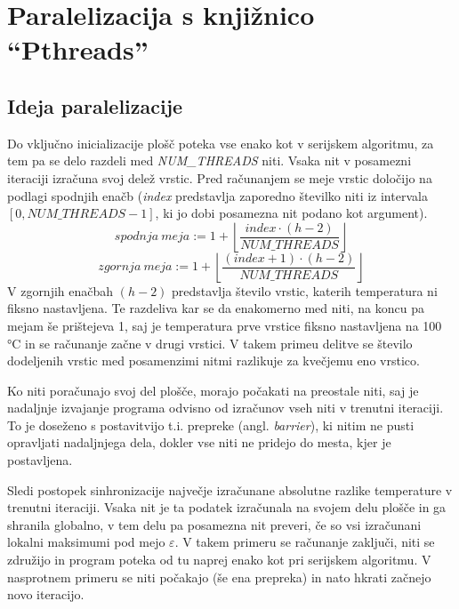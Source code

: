 \documentclass[a4paper,titlepage,11pt]{article}
\begin{document}
\pagebreak

\section{Paralelizacija s knjižnico ``Pthreads''}

\subsection{Ideja paralelizacije} \label{ideja-paralelizacije-pthreads}

Do vključno inicializacije plošč poteka vse enako kot v serijskem algoritmu, za tem pa se delo razdeli med \textit{NUM\_THREADS} niti. Vsaka nit v posamezni iteraciji izračuna svoj delež vrstic. Pred računanjem se meje vrstic določijo na podlagi spodnjih enačb (\textit{index} predstavlja zaporedno številko niti iz intervala $\left[0, NUM\_THREADS - 1\right]$, ki jo dobi posamezna nit podano kot argument).
\begin{equation}
spodnja \ meja := 1 + \left \lfloor{\frac{index \cdot (h - 2)}{NUM\_THREADS}}\right \rfloor
\end{equation}
\begin{equation}
zgornja \ meja := 1 + \left \lfloor{\frac{(index+1) \cdot (h - 2)}{NUM\_THREADS}}\right \rfloor
\end{equation}
V zgornjih enačbah $(h - 2)$ predstavlja število vrstic, katerih temperatura ni fiksno nastavljena. Te razdeliva kar se da enakomerno med niti, na koncu pa mejam še prištejeva 1, saj je temperatura prve vrstice fiksno nastavljena na 100 °C in se računanje začne v drugi vrstici. V takem primeu delitve se število dodeljenih vrstic med posamenzimi nitmi razlikuje za kvečjemu eno vrstico.

Ko niti poračunajo svoj del plošče, morajo počakati na preostale niti, saj je nadaljnje izvajanje programa odvisno od izračunov vseh niti v trenutni iteraciji. To je doseženo s postavitvijo t.i. prepreke (angl. \textit{barrier}), ki nitim ne pusti opravljati nadaljnjega dela, dokler vse niti ne pridejo do mesta, kjer je postavljena.

Sledi postopek sinhronizacije največje izračunane absolutne razlike temperature v trenutni iteraciji. Vsaka nit je ta podatek izračunala na svojem delu plošče in ga shranila globalno, v tem delu pa posamezna nit preveri, če so vsi izračunani lokalni maksimumi pod mejo \(\varepsilon\). V takem primeru se računanje zaključi, niti se združijo in program poteka od tu naprej enako kot pri serijskem algoritmu. V nasprotnem primeru se niti počakajo (še ena prepreka) in nato hkrati začnejo novo iteracijo.
\end{document}
